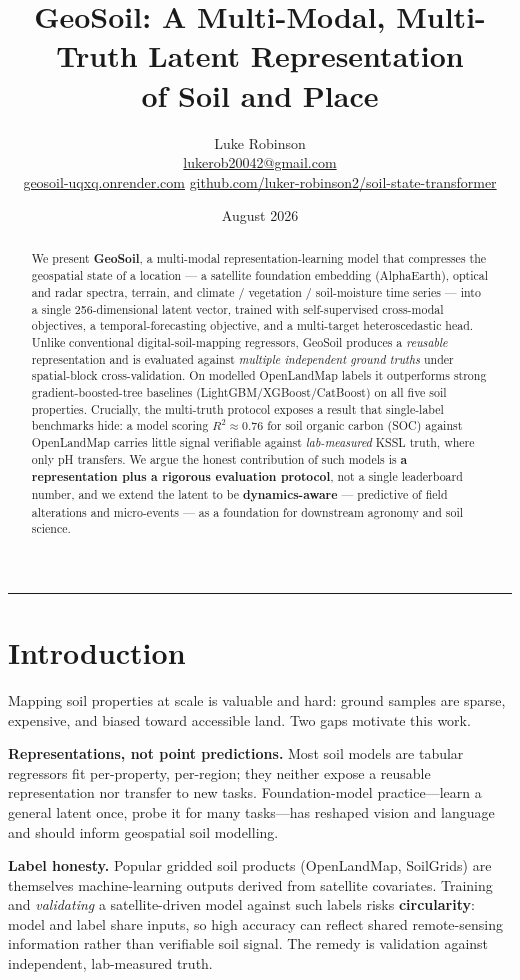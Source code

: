 \documentclass[11pt]{article}
\title{\textbf{GeoSoil: A Multi-Modal, Multi-Truth Latent Representation\\of Soil and Place}}
\author{Luke Robinson\\[3pt]
\normalsize\href{mailto:lukerob20042@gmail.com}{lukerob20042@gmail.com}\\[1pt]
\normalsize\href{https://geosoil-uqxq.onrender.com}{geosoil-uqxq.onrender.com}
\;\textbar\;
\normalsize\href{https://github.com/luker-robinson2/soil-state-transformer}{github.com/luker-robinson2/soil-state-transformer}}
\date{August 2026}
\begin{document}
\maketitle
\hrule\vspace{0.6em}

\begin{abstract}
\noindent We present \textbf{GeoSoil}, a multi-modal representation-learning model
that compresses the geospatial state of a location --- a satellite foundation
embedding (AlphaEarth), optical and radar spectra, terrain, and climate /
vegetation / soil-moisture time series --- into a single 256-dimensional latent
vector, trained with self-supervised cross-modal objectives, a temporal-forecasting
objective, and a multi-target heteroscedastic head. Unlike conventional
digital-soil-mapping regressors, GeoSoil produces a \emph{reusable} representation
and is evaluated against \emph{multiple independent ground truths} under
spatial-block cross-validation. On modelled OpenLandMap labels it outperforms strong
gradient-boosted-tree baselines (LightGBM/XGBoost/CatBoost) on all five soil
properties. Crucially, the multi-truth protocol exposes a result that single-label
benchmarks hide: a model scoring $R^2\approx0.76$ for soil organic carbon (SOC)
against OpenLandMap carries little signal verifiable against \emph{lab-measured}
KSSL truth, where only pH transfers. We argue the honest contribution of such models
is \textbf{a representation plus a rigorous evaluation protocol}, not a single
leaderboard number, and we extend the latent to be \textbf{dynamics-aware} ---
predictive of field alterations and micro-events --- as a foundation for downstream
agronomy and soil science.
\end{abstract}

\section{Introduction}
Mapping soil properties at scale is valuable and hard: ground samples are sparse,
expensive, and biased toward accessible land. Two gaps motivate this work.

\textbf{Representations, not point predictions.} Most soil models are tabular
regressors fit per-property, per-region; they neither expose a reusable
representation nor transfer to new tasks. Foundation-model practice---learn a general
latent once, probe it for many tasks---has reshaped vision and language and should
inform geospatial soil modelling.

\textbf{Label honesty.} Popular gridded soil products (OpenLandMap, SoilGrids) are
themselves machine-learning outputs derived from satellite covariates. Training and
\emph{validating} a satellite-driven model against such labels risks
\textbf{circularity}: model and label share inputs, so high accuracy can reflect
shared remote-sensing information rather than verifiable soil signal. The remedy is
validation against independent, lab-measured truth.
\end{document}
